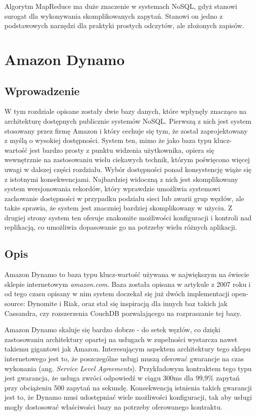 Algorytm MapReduce ma duże znaczenie w systemach NoSQL, gdyż stanowi surogat dla wykonywania skomplikowanych zapytań.
Stanowi on jedno z podstawowych narzędzi dla praktyki prostych odczytów, ale złożonych zapisów.

\section{Amazon Dynamo}

\subsection*{Wprowadzenie}

W tym rozdziale opisane zostały dwie bazy danych, które wpłynęły znacząco na architekturę dostępnych publicznie systemów NoSQL.
Pierwszą z nich jest system stosowany przez firmę Amazon i który cechuje się tym, że został zaprojektowany z myślą o wysokiej dostępności.
System ten, mimo że jako baza typu klucz-wartość jest bardzo prosty z punktu widzenia użytkownika, opiera się wewnętrznie na zastosowaniu wielu ciekawych technik, którym poświęcono więcej uwagi w dalszej części rozdziału.
Wybór dostępności ponad konsystencję wiąże się z istotnymi konsekwencjami.
Najbardziej widoczną z nich jest skomplikowany system wersjonowania rekordów, który wprawdzie umożliwia systemowi zachowanie dostępności w przypadku podziału sieci lub awarii grup węzłów, ale także sprawia, że system jest znaczniej bardziej skomplikowany w użyciu.
Z drugiej strony system ten oferuje znakomite możliwości konfiguracji i kontroli nad replikacją, co umożliwia dopasowanie go na potrzeby wielu różnych aplikacji.

\subsection*{Opis}

Amazon Dynamo to baza typu klucz-wartość używana w największym na świecie sklepie internetowym \emph{amazon.com}.
Baza została opisana w artykule z 2007 roku \cite{amazon-dynamo} i od tego czasu opisany w nim system doczekał się już dwóch implementacji open-source: Dynomite i Riak, oraz stał się inspiracją dla innych baz takich jak Cassandra, czy rozszerzenia CouchDB pozwalającego na rozpraszanie tej bazy.

Amazon Dynamo skaluje się bardzo dobrze - do setek węzłów, co dzięki zastosowaniu architektury opartej na usługach w zupełności wystarcza nawet takiemu gigantowi jak Amazon.
Interesującym aspektem architektury tego sklepu internetowego jest to, że poszczególne usługi muszą oferować gwarancje na czas wykonania (ang. \emph{Service Level Agreements}).
Przykładowym kontraktem tego typu jest gwarancja, że usługa zwróci odpowiedź w ciągu 300ms dla 99,9\% zapytań przy obciążeniu 500 zapytań na sekundę.
Konsekwencją istnienia takich gwarancji jest to, że Dynamo musi udostępniać wiele możliwości konfiguracji, tak aby usługi mogły dostosować właściwości bazy na potrzeby oferowanego kontraktu.

